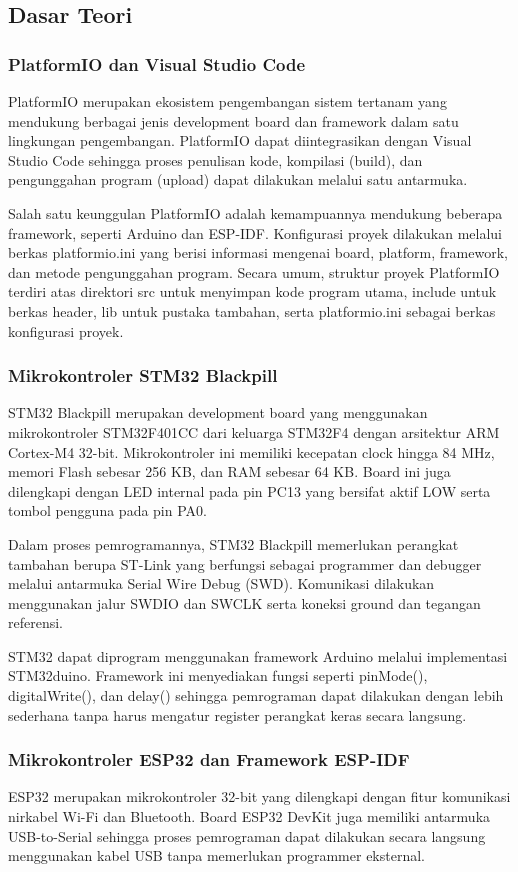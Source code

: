 \subsection{Dasar Teori}
\subsubsection{PlatformIO dan Visual Studio Code}
PlatformIO merupakan ekosistem pengembangan sistem tertanam yang mendukung berbagai jenis development board dan framework dalam satu lingkungan pengembangan. PlatformIO dapat diintegrasikan dengan Visual Studio Code sehingga proses penulisan kode, kompilasi (build), dan pengunggahan program (upload) dapat dilakukan melalui satu antarmuka.

Salah satu keunggulan PlatformIO adalah kemampuannya mendukung beberapa framework, seperti Arduino dan ESP-IDF. Konfigurasi proyek dilakukan melalui berkas platformio.ini yang berisi informasi mengenai board, platform, framework, dan metode pengunggahan program. Secara umum, struktur proyek PlatformIO terdiri atas direktori src untuk menyimpan kode program utama, include untuk berkas header, lib untuk pustaka tambahan, serta platformio.ini sebagai berkas konfigurasi proyek.

\subsubsection{Mikrokontroler STM32 Blackpill}
STM32 Blackpill merupakan development board yang menggunakan mikrokontroler STM32F401CC dari keluarga STM32F4 dengan arsitektur ARM Cortex-M4 32-bit. Mikrokontroler ini memiliki kecepatan clock hingga 84 MHz, memori Flash sebesar 256 KB, dan RAM sebesar 64 KB. Board ini juga dilengkapi dengan LED internal pada pin PC13 yang bersifat aktif LOW serta tombol pengguna pada pin PA0.

Dalam proses pemrogramannya, STM32 Blackpill memerlukan perangkat tambahan berupa ST-Link yang berfungsi sebagai programmer dan debugger melalui antarmuka Serial Wire Debug (SWD). Komunikasi dilakukan menggunakan jalur SWDIO dan SWCLK serta koneksi ground dan tegangan referensi.

STM32 dapat diprogram menggunakan framework Arduino melalui implementasi STM32duino. Framework ini menyediakan fungsi seperti pinMode(), digitalWrite(), dan delay() sehingga pemrograman dapat dilakukan dengan lebih sederhana tanpa harus mengatur register perangkat keras secara langsung.

\subsubsection{Mikrokontroler ESP32 dan Framework ESP-IDF}
ESP32 merupakan mikrokontroler 32-bit yang dilengkapi dengan fitur komunikasi nirkabel Wi-Fi dan Bluetooth. Board ESP32 DevKit juga memiliki antarmuka USB-to-Serial sehingga proses pemrograman dapat dilakukan secara langsung menggunakan kabel USB tanpa memerlukan programmer eksternal.

